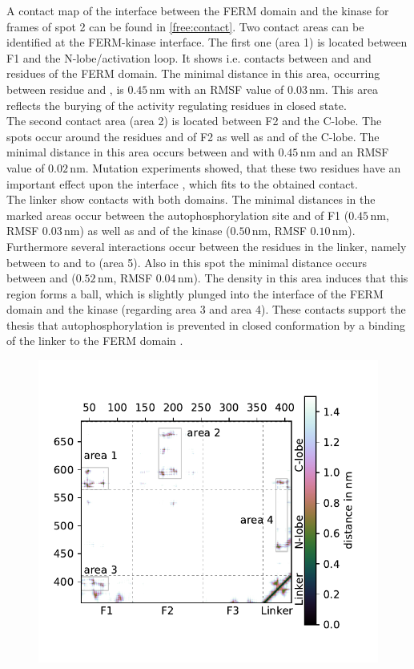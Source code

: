 %
%
%
A contact map of the interface between the FERM domain and the kinase for frames of spot 2 can be found in \autoref{free:contact}. Two contact areas can be identified at the FERM-kinase interface. The first one (area 1) is located between F1 and the N-lobe/activation loop. It shows i.e. contacts between  and  and residues of the FERM domain. The minimal distance in this area, occurring between residue  and , is $0.45\,\si{\nano\metre}$ with an RMSF value of $0.03\,\si{\nano\metre}$. This area reflects the burying of the activity regulating residues in closed state.\\
The second contact area (area 2) is located between F2 and the C-lobe. The spots occur around the residues  and  of F2 as well as  and  of the C-lobe. The minimal distance in this area occurs between  and  with $0.45\,\si{\nano\metre}$ and an RMSF value of $0.02\,\si{\nano\metre}$. Mutation experiments showed, that these two residues have an important effect upon the interface \autocite{structFAK}, which fits to the obtained contact.\\
The linker show contacts with both domains. The minimal distances in the marked areas occur between the autophosphorylation site  and  of F1 ($0.45\,\si{\nano\metre}$, RMSF $0.03\,\si{\nano\metre}$) as well as  and  of the kinase ($0.50\,\si{\nano\metre}$, RMSF $0.10\,\si{\nano\metre}$). Furthermore several interactions occur between the residues in the linker, namely between  to  and  to  (area 5). Also in this spot the minimal distance occurs between  and  ($0.52\,\si{\nano\metre}$, RMSF $0.04\,\si{\nano\metre}$). The density in this area induces that this region forms a ball, which is slightly plunged into the interface of the FERM domain and the kinase (regarding area 3 and area 4). These contacts support the thesis that autophosphorylation is prevented in closed conformation by a binding of the linker to the FERM domain \autocite{pap003}.\\ %
%
%
%
\begin{figure}
	\centering
	\includegraphics[width=.7\textwidth]{figures/results/contactmap_free}
	\label{free:contact}
\end{figure}
%
%
%
